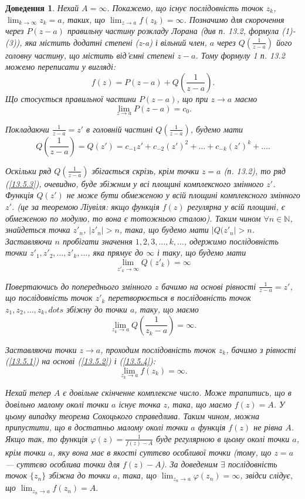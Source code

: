 \documentclass[12pt,fleqn]{article}
\theoremstyle{theorem}
\theoremstyle{proof}
\newtheorem*{dov}{Доведення}
\numberwithin{figure}{section}
\numberwithin{equation}{section}
\begin{document}
\begin{dov}
Нехай $A=\infty$. Покажемо, що існує послідовність точок $z_k$, \\ $\lim_{k\to\infty}z_k=a$, таких, що $\lim_{z\to a}f(z_k)=\infty$. Позначимо для скорочення через $P(z-a)$ правильну частину розкладу Лорана (див п. 13.2, формула (1)-(3)), яка містить додатні степені (z-a) і вільний член, $a$ через $Q(\frac{1}{z-a})$ його головну частину, що містить від'ємні степені $z-a$. Тому формулу 1 п. 13.2 можемо переписати у вигляді:
\begin{equation}\label{13.5.1}
  f(z)=P(z-a)+Q(\frac{1}{z-a}).
\end{equation}
Що стосується правильної частини $P(z-a)$, що при $z\to a$ маємо
\begin{equation}\label{13.5.2}
  \lim_{z\to a}P(z-a)=c_0.
\end{equation}

Покладаючи $\frac{1}{z-a}=z'$ в головній частині $Q(\frac{1}{z-a})$, будемо мати
\begin{equation}\label{13.5.3}
  Q(\frac{1}{z-a})=Q(z')=c_{-1}z'+c_{-2}(z')^2+\dots+c_{-k}(z')^k+\dots.
\end{equation}

Оскільки ряд $Q(\frac{1}{z-a})$ збігається скрізь, крім точки $z=a$ (п. 13.2), то ряд (\ref{13.5.3}), очевидно, буде збіжним у всі площині комплексного змінного $z'$. Функція $Q(z')$ не може бути обмеженою у всій площині комплексного змінного $z'$. (це за теоремою Ліувіля: якщо функція $f(z)$ регулярна у всій площині, є обмеженою по модулю, то вона є тотожньою сталою). Таким чином $\forall n \in \mathbb{N}$, знайдеться точка $z'_n$, $|z'_n|>n$, така, що будемо мати $|Q(z'_n|>n$. Заставляючи $n$ пробігати значення $1,2,3,\dots,k,\dots$, одержимо послідовність точки $z'_1,z'_2,\dots,z'_k,\dots$, яка прямує до $\infty$ і таку, що будемо мати
$$\lim_{z'_k\to\infty}Q(z'_k)=\infty$$

Повертаючись до попереднього змінного $z$ бачимо на основі рівності $\frac{1}{z-a}=z'$, що послідовність точок $z'_k$ перетворюється в послідовність точок $z_1, z_2, \dots, z_k, dots$ збіжну до точки $a$, таку, що маємо
\begin{equation}\label{13.5.4}
  \lim_{z_k\to a}Q(\frac{1}{z_k-a})=\infty.
\end{equation}

Заставляючи точки $z\to a$, проходим послідовність точок $z_k$, бачимо з рівності (\ref{13.5.1}) на основі (\ref{13.5.2}) і (\ref{13.5.4}):
$$\lim_{z_k\to a}f(z_k)=\infty.$$

Нехай тепер $A$ є довільне скінченне комплексне число. Може трапитись, що в довільно малому околі точки $a$ існує точка $z$, така, що маємо $f(z)=A$. У цьому випадку теорема Сохоцького справедлива. Таким чином, можна припустити, що в достатньо малому околі точки $a$ функція $f(z)$ не рівна $A$. Якщо так, то функція $\varphi(z)=\frac{1}{f(z)-A}$ буде регулярною в цьому околі точки $a$, крім точки $a$, яку вона має в якості суттєво особливої точки (тому, що $z=a$ --- суттєво особлива точки для $f(z)-A$). За доведеним $\exists$ послідовність точок $\{z_n\}$ збіжна до точки $a$, така, що $\lim_{z_n \to a}\varphi(z_n)=\infty$, звідси слідує, що $\lim_{z_n\to a}f(z_n)=A.$
\end{dov}
\end{document}
